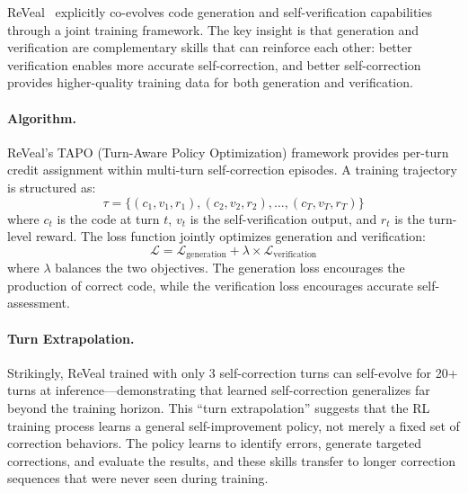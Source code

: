ReVeal~\citep{jin2025reveal} explicitly co-evolves code generation and self-verification capabilities through a joint training framework. The key insight is that generation and verification are complementary skills that can reinforce each other: better verification enables more accurate self-correction, and better self-correction provides higher-quality training data for both generation and verification.

\paragraph{Algorithm.}
ReVeal's TAPO (Turn-Aware Policy Optimization) framework provides per-turn credit assignment within multi-turn self-correction episodes. A training trajectory is structured as:
\begin{equation}
    \tau = \{(c_1, v_1, r_1), (c_2, v_2, r_2), \ldots, (c_T, v_T, r_T)\}
    \label{eq:reveal-trajectory}
\end{equation}
where $c_t$ is the code at turn $t$, $v_t$ is the self-verification output, and $r_t$ is the turn-level reward. The loss function jointly optimizes generation and verification:
\begin{equation}
    \mathcal{L} = \mathcal{L}_{\text{generation}} + \lambda \times \mathcal{L}_{\text{verification}}
    \label{eq:reveal-loss}
\end{equation}
where $\lambda$ balances the two objectives. The generation loss encourages the production of correct code, while the verification loss encourages accurate self-assessment.

\paragraph{Turn Extrapolation.}
Strikingly, ReVeal trained with only 3 self-correction turns can self-evolve for 20+ turns at inference---demonstrating that learned self-correction generalizes far beyond the training horizon. This ``turn extrapolation'' suggests that the RL training process learns a general self-improvement policy, not merely a fixed set of correction behaviors. The policy learns to identify errors, generate targeted corrections, and evaluate the results, and these skills transfer to longer correction sequences that were never seen during training.

